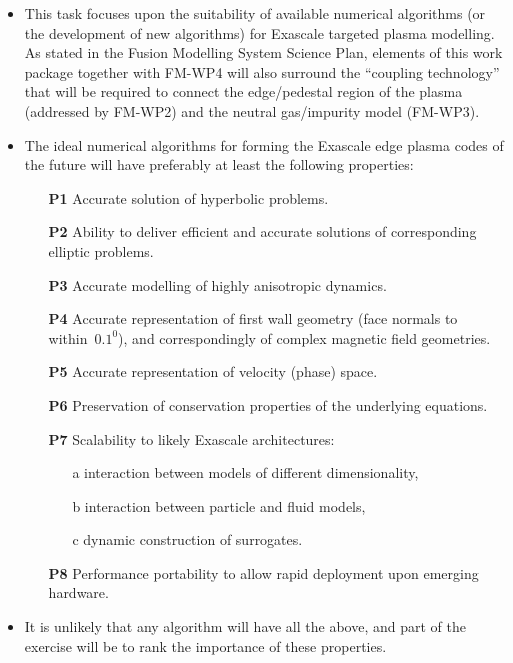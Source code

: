 \begin{itemize}
\item This task focuses upon the suitability of available numerical 
algorithms (or the development of new algorithms)
for Exascale targeted plasma modelling. As stated in the Fusion Modelling System
Science Plan, elements of this work package together with FM-WP4 will also
surround the ``coupling technology'' that will be required to connect the 
edge/pedestal region of the plasma (addressed
by FM-WP2) and the neutral gas/impurity model (FM-WP3).

\item The ideal numerical algorithms for forming the Exascale edge plasma codes of 
the future will have preferably at least the following properties:
\begin{itemize}
\item[{\bf P1}] Accurate solution of hyperbolic problems.
\item[{\bf P2}] Ability to deliver efficient and accurate solutions of corresponding 
elliptic problems.
\item[{\bf P3}] Accurate modelling of highly anisotropic dynamics. 
\item[{\bf P4}] Accurate representation of first wall geometry (face normals to
within~$0.1^{0}$), and correspondingly of complex magnetic field geometries.
\item[{\bf P5}] Accurate representation of velocity (phase) space.
\item[{\bf P6}] Preservation of conservation properties of the underlying equations.
\item[{\bf P7}] Scalability to likely Exascale architectures:
\begin{itemize}
\item[a] interaction between models of different dimensionality,
\item[b] interaction between particle and fluid models,
\item[c] dynamic construction of surrogates.
\end{itemize}
\item[{\bf P8}] Performance portability to allow rapid deployment upon emerging hardware.
\end{itemize}

\item It is unlikely that any algorithm will have all the above, and part of the exercise
will be to rank the importance of these properties.


\end{itemize}
